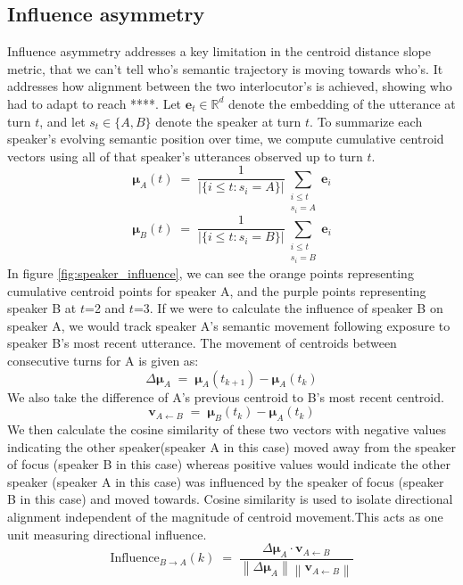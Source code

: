\documentclass{article}
\theoremstyle{definition}
\numberwithin{table}{section}
\begin{document}
\subsection{Influence asymmetry}

Influence asymmetry addresses a key limitation in the centroid distance slope metric, that we can't tell who's semantic trajectory is moving towards who's. It addresses how alignment between the two interlocutor's is achieved, showing who had to adapt to reach ****. 
Let $\mathbf{e}_t \in \mathbb{R}^d$ denote the embedding of the utterance at turn $t$, and let $s_t \in \{A,B\}$ denote the speaker at turn $t$. To summarize each speaker’s evolving semantic position over time, we compute cumulative centroid vectors using all of that speaker’s utterances observed up to turn $t$.
\begin{equation}
\boldsymbol{\mu}_A(t) \;=\; 
\frac{1}{\left|\{ i \le t : s_i = A \}\right|}
\sum_{\substack{i \le t \\ s_i = A}} \mathbf{e}_i
\end{equation}
\begin{equation}
\boldsymbol{\mu}_B(t) \;=\; 
\frac{1}{\left|\{ i \le t : s_i = B \}\right|}
\sum_{\substack{i \le t \\ s_i = B}} \mathbf{e}_i
\end{equation}
In figure \ref{fig:speaker_influence}, we can see the orange points representing cumulative centroid points for speaker A, and the purple points representing speaker B at $t$=2 and $t$=3. If we were to calculate the influence of speaker B on speaker A, we would track speaker A’s semantic movement following exposure to speaker B’s most recent utterance. The movement of centroids between consecutive turns for A is given as: 
\begin{equation}
\Delta \boldsymbol{\mu}_A \;=\; \boldsymbol{\mu}_A(t_{k+1}) - \boldsymbol{\mu}_A(t_k)
\end{equation}
We also take the difference of A's previous centroid to B's most recent centroid. 
\begin{equation}
\mathbf{v}_{A \leftarrow B} \;=\; \boldsymbol{\mu}_B(t_k) - \boldsymbol{\mu}_A(t_k)
\end{equation}
We then calculate the cosine similarity of these two vectors with negative values indicating the other speaker(speaker A in this case) moved away from the speaker of focus (speaker B in this case) whereas positive values would indicate the other speaker (speaker A in this case) was influenced by the speaker of focus (speaker B in this case) and moved towards. Cosine similarity is used to isolate directional alignment independent of the magnitude of centroid movement.This acts as one unit measuring directional influence. 
\begin{equation}
\mathrm{Influence}_{B \rightarrow A}(k)
\;=\;
\frac{
\Delta \boldsymbol{\mu}_A \cdot \mathbf{v}_{A \leftarrow B}
}{
\left\|\Delta \boldsymbol{\mu}_A\right\|
\left\|\mathbf{v}_{A \leftarrow B}\right\|
}
\end{equation}
\end{document}
